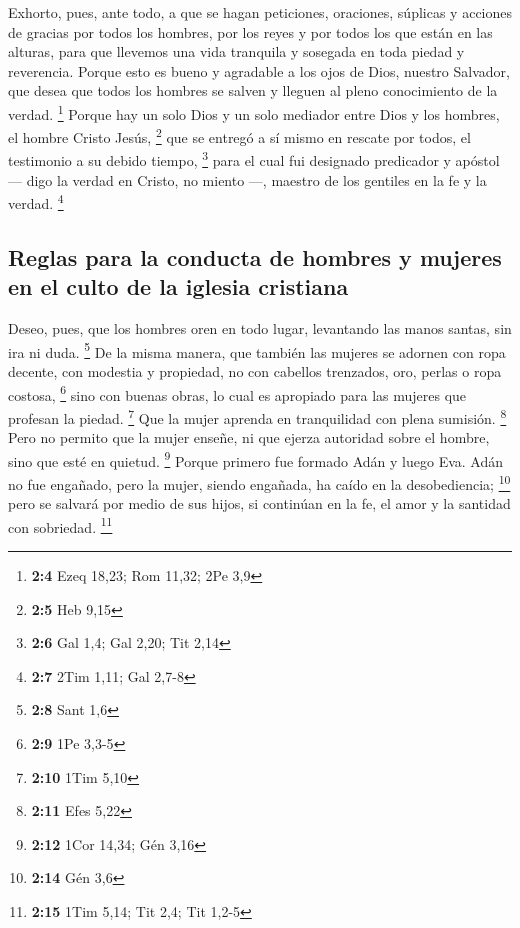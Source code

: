 \begin{paracol}{2}
 Exhorto, pues, ante todo, a que se hagan peticiones,
oraciones, súplicas y acciones de gracias por todos los hombres,
 por los reyes y por todos los que están en las alturas,
para que llevemos una vida tranquila y sosegada en toda piedad y
reverencia.  Porque esto es bueno y agradable a los ojos
de Dios, nuestro Salvador,  que desea que todos los
hombres se salven y lleguen al pleno conocimiento de la verdad.
\footnote{\textbf{2:4} Ezeq 18,23; Rom 11,32; 2Pe 3,9} 
Porque hay un solo Dios y un solo mediador entre Dios y los hombres, el
hombre Cristo Jesús, \footnote{\textbf{2:5} Heb 9,15}  que
se entregó a sí mismo en rescate por todos, el testimonio a su debido
tiempo, \footnote{\textbf{2:6} Gal 1,4; Gal 2,20; Tit 2,14}
 para el cual fui designado predicador y apóstol --- digo
la verdad en Cristo, no miento ---, maestro de los gentiles en la fe y
la verdad. \footnote{\textbf{2:7} 2Tim 1,11; Gal 2,7-8}

\hypertarget{reglas-para-la-conducta-de-hombres-y-mujeres-en-el-culto-de-la-iglesia-cristiana}{%
\subsection{Reglas para la conducta de hombres y mujeres en el culto de
la iglesia
cristiana}\label{reglas-para-la-conducta-de-hombres-y-mujeres-en-el-culto-de-la-iglesia-cristiana}}

 Deseo, pues, que los hombres oren en todo lugar,
levantando las manos santas, sin ira ni duda. \footnote{\textbf{2:8}
  Sant 1,6}  De la misma manera, que también las mujeres
se adornen con ropa decente, con modestia y propiedad, no con cabellos
trenzados, oro, perlas o ropa costosa, \footnote{\textbf{2:9} 1Pe 3,3-5}
 sino con buenas obras, lo cual es apropiado para las
mujeres que profesan la piedad. \footnote{\textbf{2:10} 1Tim 5,10}
 Que la mujer aprenda en tranquilidad con plena sumisión.
\footnote{\textbf{2:11} Efes 5,22}  Pero no permito que
la mujer enseñe, ni que ejerza autoridad sobre el hombre, sino que esté
en quietud. \footnote{\textbf{2:12} 1Cor 14,34; Gén 3,16}
 Porque primero fue formado Adán y luego Eva.
 Adán no fue engañado, pero la mujer, siendo engañada, ha
caído en la desobediencia; \footnote{\textbf{2:14} Gén 3,6}
 pero se salvará por medio de sus hijos, si continúan en
la fe, el amor y la santidad con sobriedad. \footnote{\textbf{2:15} 1Tim
  5,14; Tit 2,4; Tit 1,2-5}


\end{paracol}
